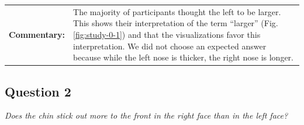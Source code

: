 \begin{tabular}{l p{}}
	{\bf Commentary:} & The majority of participants thought the left to be larger. This shows their interpretation of the term ``larger'' (Fig. \ref{fig:study-0-1}) and that the visualizations favor this interpretation. We did not choose an expected answer because while the left nose is thicker, the right nose is longer. \\
\end{tabular}
 
\clearpage

\subsection{Question 2}
\label{attch:complete_study_results-question2}

\begin{center}{\it Does the chin stick out more to the front in the right face than in the left face?}\end{center}

